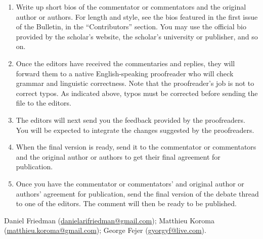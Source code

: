 \documentclass[11pt]{article}
\begin{document}
\begin{enumerate}
\item Write up short bios of the commentator or commentators and the original author or authors. For length and style, see the bios featured in the first issue of the Bulletin, in the ``Contributors'' section. You may use the official bio provided by the scholar's website, the scholar's university or publisher, and so on.
\item Once the editors have received the commentaries and replies, they will forward them to a native English-speaking proofreader who will check grammar and linguistic correctness. Note that the proofreader's job is not to correct typos. As indicated above, typos must be corrected before sending the file to the editors.
\item The editors will next send you the feedback provided by the proofreaders. You will be expected to integrate the changes suggested by the proofreaders.
\item When the final version is ready, send it to the commentator or commentators and the original author or authors to get their final agreement for publication.
\item Once you have the commentator or commentators' and original author or authors' agreement for publication, send the final version of the debate thread to one of the editors. The comment will then be ready to be published.
\end{enumerate}


Daniel Friedman (\href{mailto:danielarifriedman@gmail.com}{danielarifriedman@gmail.com}); Matthieu Koroma (\href{mailto:matthieu.koroma@gmail.com}{matthieu.koroma@gmail.com}); George Fejer (\href{mailto:gyorgyf@live.com}{gyorgyf@live.com}).
\end{document}
